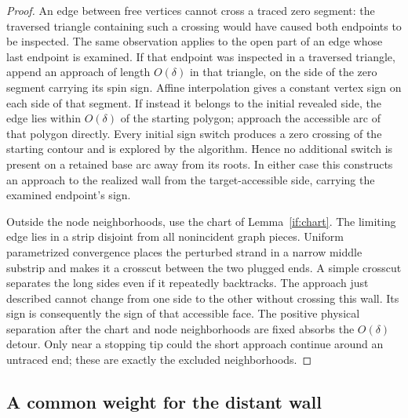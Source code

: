 \documentclass[11pt]{article}
\theoremstyle{definition}
\theoremstyle{remark}
\numberwithin{equation}{section}
\begin{document}
\begin{proof}
An edge between free vertices cannot cross a traced zero segment:
the traversed triangle containing such a crossing would have caused
both endpoints to be inspected.  The same observation applies to
the open part of an edge whose last endpoint is examined.  If that
endpoint was inspected in a traversed triangle, append an approach
of length $O(\delta)$ in that triangle, on the side of the zero
segment carrying its spin sign.  Affine interpolation gives a
constant vertex sign on each side of that segment.  If instead it
belongs to the initial revealed side, the edge lies within
$O(\delta)$ of the starting polygon; approach the accessible arc
of that polygon directly.  Every initial sign switch produces a
zero crossing of the starting contour and is explored by the
algorithm.  Hence no additional switch is present on a retained
base arc away from its roots.  In either case this constructs an
approach to the realized wall from the target-accessible side,
carrying the examined endpoint's sign.

Outside the node neighborhoods, use the chart of
Lemma~\ref{if:chart}.  The limiting edge lies in a strip disjoint from
all nonincident graph pieces.  Uniform parametrized convergence
places the perturbed strand in a narrow middle substrip and makes
it a crosscut between the two plugged ends.  A simple crosscut
separates the long sides even if it repeatedly backtracks.  The
approach just described cannot change from one side to the other
without crossing this wall.  Its sign is consequently the sign of
that accessible face.  The positive physical separation after the
chart and node neighborhoods are fixed absorbs the $O(\delta)$
detour.  Only near a stopping tip could the short approach continue
around an untraced end; these are exactly the excluded neighborhoods.
\end{proof}

\subsection{A common weight for the distant wall}
\end{document}

